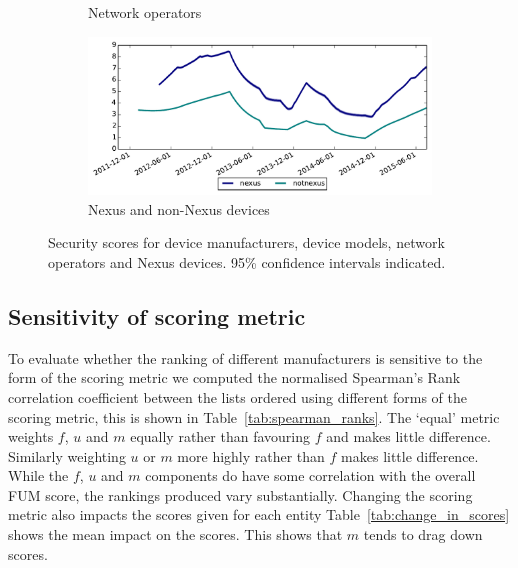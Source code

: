 \begin{figure}
\begin{subfigure}{\columnwidth}
\caption{Network operators}
\label{fig:security_score_operator}
\end{subfigure}
%
\begin{subfigure}{\columnwidth}
\includegraphics[width=\columnwidth]{figures/security_score_summary}
\caption{Nexus and non-Nexus devices}
\label{fig:security_score_summary}
\end{subfigure}
\caption{Security scores for device manufacturers, device models, network operators and Nexus devices. 95\% confidence intervals indicated.}
\label{fig:security_scores}
\end{figure}

\subsection{Sensitivity of scoring metric}
\daTabSpearmanRanks
\daTabChangeInScores
To evaluate whether the ranking of different manufacturers is sensitive to the form of the scoring metric we computed the normalised Spearman's Rank correlation coefficient between the lists ordered using different forms of the scoring metric, this is shown in Table~\ref{tab:spearman_ranks}.
The `equal' metric weights $f$, $u$ and $m$ equally rather than favouring $f$ and makes little difference.
Similarly weighting $u$ or $m$ more highly rather than $f$ makes little difference.
While the $f$, $u$ and $m$ components do have some correlation with the overall FUM score, the rankings produced vary substantially.
Changing the scoring metric also impacts the scores given for each entity Table~\ref{tab:change_in_scores} shows the mean impact on the scores.
This shows that $m$ tends to drag down scores.


